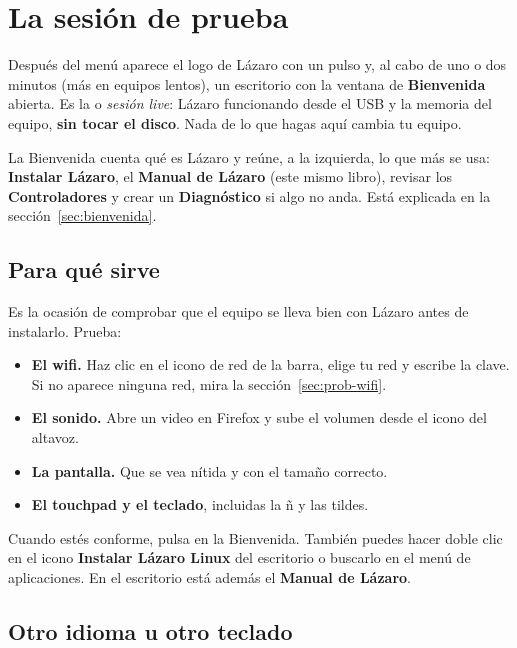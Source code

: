 \chapter{La sesión de prueba}\label{cap:03-sesion-de-prueba}

Después del menú aparece el logo de Lázaro con un pulso y, al cabo de uno
o dos minutos (más en equipos lentos), un escritorio con la ventana de
\textbf{Bienvenida} abierta. Es la  o
\emph{sesión live}: Lázaro funcionando desde el USB y la memoria del
equipo, \textbf{sin tocar el disco}. Nada de lo que hagas aquí cambia tu
equipo.


La Bienvenida cuenta qué es Lázaro y reúne, a la izquierda, lo que más se
usa: \textbf{Instalar Lázaro}, el \textbf{Manual de Lázaro} (este mismo
libro), revisar los \textbf{Controladores} y crear un \textbf{Diagnóstico}
si algo no anda. Está explicada en la sección~\ref{sec:bienvenida}.

\section{Para qué sirve}

Es la ocasión de comprobar que el equipo se lleva bien con Lázaro antes
de instalarlo. Prueba:

\begin{itemize}
  \item \textbf{El wifi.} Haz clic en el icono de red de la barra, elige tu
        red y escribe la clave. Si no aparece ninguna red, mira
        la sección~\ref{sec:prob-wifi}.
  \item \textbf{El sonido.} Abre un video en Firefox y sube el volumen desde
        el icono del altavoz.
  \item \textbf{La pantalla.} Que se vea nítida y con el tamaño correcto.
  \item \textbf{El touchpad y el teclado}, incluidas la ñ y las tildes.
\end{itemize}

Cuando estés conforme, pulsa  en la Bienvenida. También
puedes hacer doble clic en el icono \textbf{Instalar Lázaro Linux} del
escritorio o buscarlo en el menú de aplicaciones. En el escritorio está
además el \textbf{Manual de Lázaro}.

\section{Otro idioma u otro teclado}\label{sec:idioma-live}

